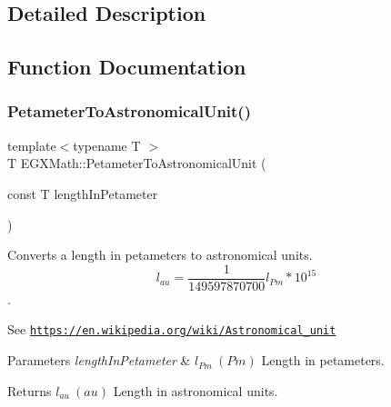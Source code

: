 \subsection{Detailed Description}


\subsection{Function Documentation}
\mbox{\label{group___e_g_x_math-_conversions-_length_conversions-_petameter-_astronomical_ga8d28d4fb81bdbac19c416be69973fcf9}} 
\subsubsection{\texorpdfstring{Petameter\+To\+Astronomical\+Unit()}{PetameterToAstronomicalUnit()}}
{\footnotesize\ttfamily template$<$typename T $>$ \\
T E\+G\+X\+Math\+::\+Petameter\+To\+Astronomical\+Unit (\begin{DoxyParamCaption}\item[{const T}]{length\+In\+Petameter }\end{DoxyParamCaption})}



Converts a length in petameters to astronomical units. \[ l_{au}= \frac{1}{149597870700} l_{Pm} * 10^{15} \]. 

See \href{https://en.wikipedia.org/wiki/Astronomical_unit}{\tt https\+://en.\+wikipedia.\+org/wiki/\+Astronomical\+\_\+unit} 
\begin{DoxyParams}{Parameters}
{\em length\+In\+Petameter} & $ l_{Pm}\ (Pm)$ Length in petameters. \\
\hline
\end{DoxyParams}
\begin{DoxyReturn}{Returns}
$ l_{au}\ (au)$ Length in astronomical units. 
\end{DoxyReturn}
\mbox{\label{group___e_g_x_math-_conversions-_length_conversions-_petameter-_astronomical_gaea87071d89d0f8dbb3b4df023587b82f}} 
